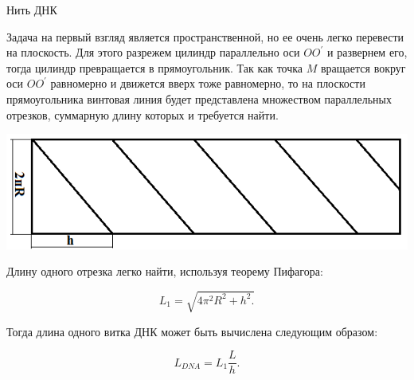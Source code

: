 \begin{tutorial}{Нить ДНК}

Задача на первый взгляд является пространственной, но ее очень легко перевести на плоскость. Для этого разрежем цилиндр параллельно оси $OO^\prime$ и развернем его, тогда цилиндр превращается в прямоугольник. Так как точка $M$ вращается вокруг оси $OO^\prime$ равномерно и движется вверх тоже равномерно, то на плоскости прямоугольника винтовая линия будет представлена множеством параллельных отрезков, суммарную длину которых и требуется найти. 

\begin{center}
\includegraphics[scale=0.4]{expansion.png}
\end{center}

Длину одного отрезка легко найти, используя теорему Пифагора: 

$$L_1=\sqrt{4\pi^2 R^2 + h^2.}$$

Тогда длина одного витка ДНК может быть вычислена следующим образом:

$$L_{DNA} = L_1 \frac{L}{h}.$$

\end{tutorial}
